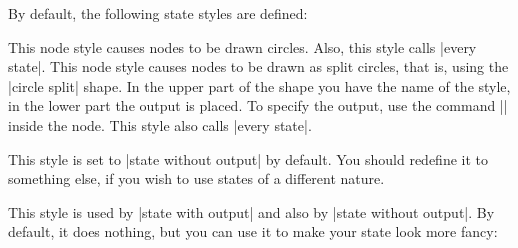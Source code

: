 By default, the following state styles are defined:
\begin{itemize}
  This node style causes nodes to be drawn circles. Also, this style
  calls |every state|.
  This node style causes nodes to be drawn as split circles, that is,
  using the |circle split| shape. In the upper part of the shape you
  have the name of the style, in the lower part the output is
  placed. To specify the output, use the command ||
  inside the node. This style also calls |every state|.
\begin{codeexample}[]
\end{codeexample}

  This style is set to |state without output| by default. You should
  redefine it to something else, if you wish to use states of a
  different nature.
\begin{codeexample}[]
\end{codeexample}

  This style is used by |state with output| and also by
  |state without output|. By default, it does nothing, but you can use
  it to make your state look more fancy:
\begin{codeexample}[]
\end{codeexample}
\end{itemize}


